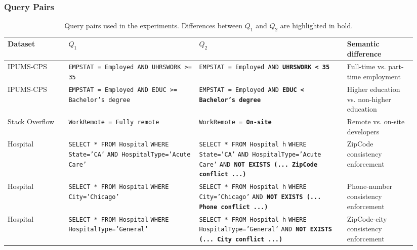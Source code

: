 \subsubsection{Query Pairs}

\begin{table}[t]
\centering
\caption{Query pairs used in the experiments. Differences between $Q_1$ and $Q_2$ are highlighted in bold.}
\label{tab:query-pairs}
\scriptsize
\begin{tabular}{p{0.14\linewidth} p{0.30\linewidth} p{0.34\linewidth} p{0.16\linewidth}}
\toprule
\textbf{Dataset} & \textbf{$Q_1$} & \textbf{$Q_2$} & \textbf{Semantic difference} \\
\midrule

IPUMS-CPS &
\texttt{EMPSTAT = Employed AND UHRSWORK >= 35} &
\texttt{EMPSTAT = Employed AND \textbf{UHRSWORK < 35}} &
Full-time vs. part-time employment \\

IPUMS-CPS &
\texttt{EMPSTAT = Employed AND EDUC >= Bachelor's degree} &
\texttt{EMPSTAT = Employed AND \textbf{EDUC < Bachelor's degree}} &
Higher education vs. non-higher education \\

Stack Overflow &
\texttt{WorkRemote = Fully remote} &
\texttt{WorkRemote = \textbf{On-site}} &
Remote vs. on-site developers \\

Hospital &
\texttt{SELECT * FROM Hospital} \newline
\texttt{WHERE State='CA'} \newline
\texttt{AND HospitalType='Acute Care'} &
\texttt{SELECT * FROM Hospital h} \newline
\texttt{WHERE State='CA'} \newline
\texttt{AND HospitalType='Acute Care'} \newline
\texttt{AND \textbf{NOT EXISTS (... ZipCode conflict ...)}} &
ZipCode consistency enforcement \\

Hospital &
\texttt{SELECT * FROM Hospital} \newline
\texttt{WHERE City='Chicago'} &
\texttt{SELECT * FROM Hospital h} \newline
\texttt{WHERE City='Chicago'} \newline
\texttt{AND \textbf{NOT EXISTS (... Phone conflict ...)}} &
Phone-number consistency enforcement \\

Hospital &
\texttt{SELECT * FROM Hospital} \newline
\texttt{WHERE HospitalType='General'} &
\texttt{SELECT * FROM Hospital h} \newline
\texttt{WHERE HospitalType='General'} \newline
\texttt{AND \textbf{NOT EXISTS (... City conflict ...)}} &
ZipCode-city consistency enforcement \\

\bottomrule
\end{tabular}
\end{table}


